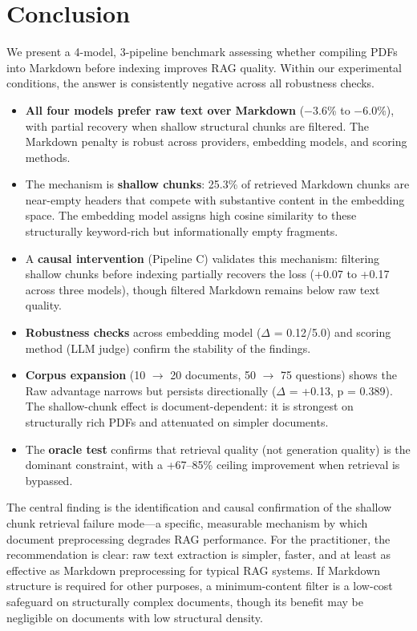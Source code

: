 \documentclass{article}
\begin{document}
\section{Conclusion}

We present a 4-model, 3-pipeline benchmark assessing whether compiling PDFs into Markdown before indexing improves RAG quality. Within our experimental conditions, the answer is consistently negative across all robustness checks.

\begin{itemize}
    \item \textbf{All four models prefer raw text over Markdown} ($-$3.6\% to $-$6.0\%), with partial recovery when shallow structural chunks are filtered. The Markdown penalty is robust across providers, embedding models, and scoring methods.

    \item The mechanism is \textbf{shallow chunks}: 25.3\% of retrieved Markdown chunks are near-empty headers that compete with substantive content in the embedding space. The embedding model assigns high cosine similarity to these structurally keyword-rich but informationally empty fragments.

    \item A \textbf{causal intervention} (Pipeline C) validates this mechanism: filtering shallow chunks before indexing partially recovers the loss (+0.07 to +0.17 across three models), though filtered Markdown remains below raw text quality.

    \item \textbf{Robustness checks} across embedding model ($\Delta$ = 0.12/5.0) and scoring method (LLM judge) confirm the stability of the findings.

    \item \textbf{Corpus expansion} (10 $\rightarrow$ 20 documents, 50 $\rightarrow$ 75 questions) shows the Raw advantage narrows but persists directionally ($\Delta$ = +0.13, p = 0.389). The shallow-chunk effect is document-dependent: it is strongest on structurally rich PDFs and attenuated on simpler documents.

    \item The \textbf{oracle test} confirms that retrieval quality (not generation quality) is the dominant constraint, with a +67--85\% ceiling improvement when retrieval is bypassed.
\end{itemize}

The central finding is the identification and causal confirmation of the shallow chunk retrieval failure mode---a specific, measurable mechanism by which document preprocessing degrades RAG performance. For the practitioner, the recommendation is clear: raw text extraction is simpler, faster, and at least as effective as Markdown preprocessing for typical RAG systems. If Markdown structure is required for other purposes, a minimum-content filter is a low-cost safeguard on structurally complex documents, though its benefit may be negligible on documents with low structural density.
\end{document}
